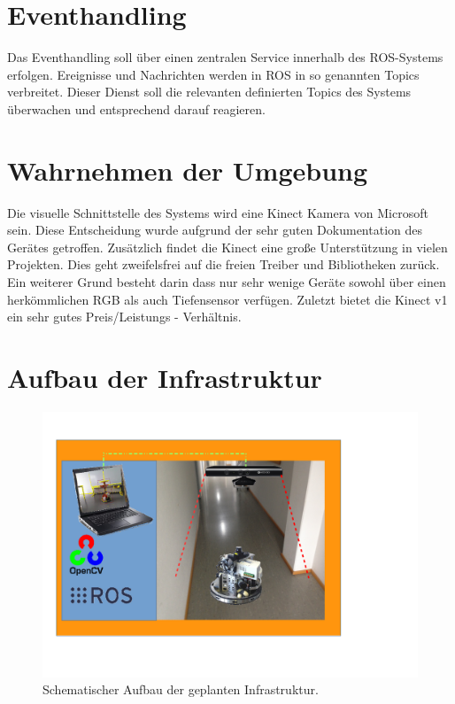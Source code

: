 	\section{Eventhandling}
	Das Eventhandling soll über einen zentralen Service innerhalb des ROS-Systems erfolgen. Ereignisse und Nachrichten werden in ROS in so genannten Topics verbreitet. Dieser Dienst soll die relevanten definierten Topics des Systems überwachen und entsprechend darauf reagieren.

	\section{Wahrnehmen der Umgebung}
	Die visuelle Schnittstelle des Systems wird eine Kinect Kamera von Microsoft sein. Diese Entscheidung wurde aufgrund der sehr guten Dokumentation des Gerätes getroffen. Zusätzlich findet die Kinect eine große Unterstützung in vielen Projekten. Dies geht zweifelsfrei auf die freien Treiber und Bibliotheken zurück. Ein weiterer Grund besteht darin dass nur sehr wenige Geräte sowohl über einen herkömmlichen RGB als auch Tiefensensor verfügen. Zuletzt bietet die Kinect v1 ein sehr gutes Preis/Leistungs - Verhältnis.
	
	\section{Aufbau der Infrastruktur}
	\begin{figure}[H]
	\centering
	\includegraphics[height=.5\textheight]{../media/infrastruktur}
	\caption{Schematischer Aufbau der geplanten Infrastruktur.}
	\label{fig:infrastruktur}
	\end{figure}
